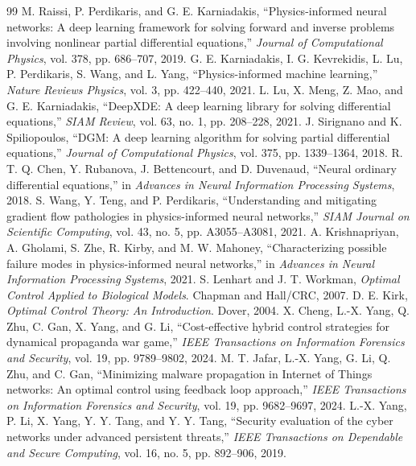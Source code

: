 \documentclass[11pt,a4paper]{article}
\begin{document}
\newpage
\begin{thebibliography}{99}
 M. Raissi, P. Perdikaris, and G. E. Karniadakis, ``Physics-informed neural networks: A deep learning framework for solving forward and inverse problems involving nonlinear partial differential equations,'' \emph{Journal of Computational Physics}, vol. 378, pp. 686--707, 2019.
 G. E. Karniadakis, I. G. Kevrekidis, L. Lu, P. Perdikaris, S. Wang, and L. Yang, ``Physics-informed machine learning,'' \emph{Nature Reviews Physics}, vol. 3, pp. 422--440, 2021.
 L. Lu, X. Meng, Z. Mao, and G. E. Karniadakis, ``DeepXDE: A deep learning library for solving differential equations,'' \emph{SIAM Review}, vol. 63, no. 1, pp. 208--228, 2021.
 J. Sirignano and K. Spiliopoulos, ``DGM: A deep learning algorithm for solving partial differential equations,'' \emph{Journal of Computational Physics}, vol. 375, pp. 1339--1364, 2018.
 R. T. Q. Chen, Y. Rubanova, J. Bettencourt, and D. Duvenaud, ``Neural ordinary differential equations,'' in \emph{Advances in Neural Information Processing Systems}, 2018.
 S. Wang, Y. Teng, and P. Perdikaris, ``Understanding and mitigating gradient flow pathologies in physics-informed neural networks,'' \emph{SIAM Journal on Scientific Computing}, vol. 43, no. 5, pp. A3055--A3081, 2021.
 A. Krishnapriyan, A. Gholami, S. Zhe, R. Kirby, and M. W. Mahoney, ``Characterizing possible failure modes in physics-informed neural networks,'' in \emph{Advances in Neural Information Processing Systems}, 2021.
 S. Lenhart and J. T. Workman, \emph{Optimal Control Applied to Biological Models}. Chapman and Hall/CRC, 2007.
 D. E. Kirk, \emph{Optimal Control Theory: An Introduction}. Dover, 2004.
 X. Cheng, L.-X. Yang, Q. Zhu, C. Gan, X. Yang, and G. Li, ``Cost-effective hybrid control strategies for dynamical propaganda war game,'' \emph{IEEE Transactions on Information Forensics and Security}, vol. 19, pp. 9789--9802, 2024.
 M. T. Jafar, L.-X. Yang, G. Li, Q. Zhu, and C. Gan, ``Minimizing malware propagation in Internet of Things networks: An optimal control using feedback loop approach,'' \emph{IEEE Transactions on Information Forensics and Security}, vol. 19, pp. 9682--9697, 2024.
 L.-X. Yang, P. Li, X. Yang, Y. Y. Tang, and Y. Y. Tang, ``Security evaluation of the cyber networks under advanced persistent threats,'' \emph{IEEE Transactions on Dependable and Secure Computing}, vol. 16, no. 5, pp. 892--906, 2019.
\end{thebibliography}
\end{document}
